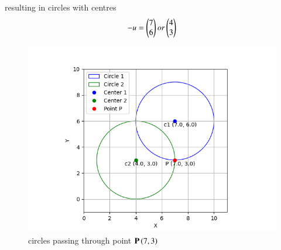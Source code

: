 \documentclass[journal]{IEEEtran}
\begin{document}
resulting in circles with centres 
\begin{align}
-u=\begin{pmatrix}7\\6\end{pmatrix} or \begin{pmatrix}4\\3\end{pmatrix}\\	
\end{align}
\begin{figure}[h!]
   \centering
   \includegraphics[width=0.7\linewidth]{figs/circle_plot.png}
   \caption{circles passing through point $\mathbf{P}\left(7,3\right)$}
\end{figure}
\end{document}
